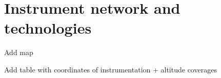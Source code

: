 \section{Instrument network and technologies}
Add map

Add table with coordinates of instrumentation + altitude coverages